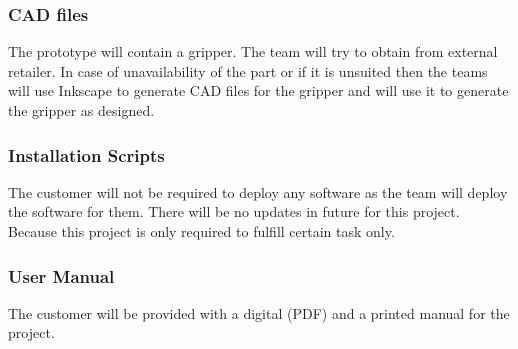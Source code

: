 \subsubsection{CAD files}
The prototype will contain a gripper. The team will try to obtain from external retailer. In case of unavailability of the part or if it is unsuited then the teams will use Inkscape to generate CAD files for the gripper and will use it to generate the gripper as designed. 

\subsubsection{Installation Scripts}
The customer will not be required to deploy any software as the team will deploy the software for them. There will be no updates in future for this project. Because this project is only required to fulfill certain task only. 

\subsubsection{User Manual}
The customer will be provided with a digital (PDF) and a printed manual for the project. 